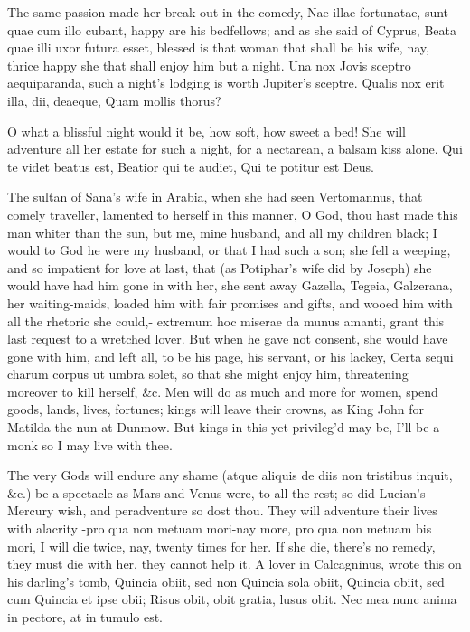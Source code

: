 {The same passion made her break out in the comedy, Nae illae
fortunatae, sunt quae cum illo cubant, happy are his bedfellows; and as
she said of Cyprus, Beata quae illi uxor futura esset, blessed is
that woman that shall be his wife, nay, thrice happy she that shall
enjoy him but a night. Una nox Jovis sceptro aequiparanda, such a
night's lodging is worth Jupiter's sceptre.
Qualis nox erit illa, dii, deaeque,
Quam mollis thorus?

O what a blissful night would it be, how soft, how sweet a bed! She
will adventure all her estate for such a night, for a nectarean, a
balsam kiss alone.
Qui te videt beatus est,
Beatior qui te audiet,
Qui te potitur est Deus.

The sultan of Sana's wife in Arabia, when she had seen Vertomannus,
that comely traveller, lamented to herself in this manner, O God,
thou hast made this man whiter than the sun, but me, mine husband, and
all my children black; I would to God he were my husband, or that I had
such a son; she fell a weeping, and so impatient for love at last, that
(as Potiphar's wife did by Joseph) she would have had him gone in with
her, she sent away Gazella, Tegeia, Galzerana, her waiting-maids,
loaded him with fair promises and gifts, and wooed him with all the
rhetoric she could,- extremum hoc miserae da munus amanti, grant this
last request to a wretched lover. But when he gave not consent, she
would have gone with him, and left all, to be his page, his servant, or
his lackey, Certa sequi charum corpus ut umbra solet, so that she might
enjoy him, threatening moreover to kill herself, \&c. Men will do as
much and more for women, spend goods, lands, lives, fortunes; kings
will leave their crowns, as King John for Matilda the nun at Dunmow.
But kings in this yet privileg'd may be,
I'll be a monk so I may live with thee.

The very Gods will endure any shame (atque aliquis de diis non
tristibus inquit, \&c.) be a spectacle as Mars and Venus were, to all
the rest; so did Lucian's Mercury wish, and peradventure so dost thou.
They will adventure their lives with alacrity -pro qua non metuam
mori-nay more, pro qua non metuam bis mori, I will die twice, nay,
twenty times for her. If she die, there's no remedy, they must die with
her, they cannot help it. A lover in Calcagninus, wrote this on his
darling's tomb,
Quincia obiit, sed non Quincia sola obiit,
Quincia obiit, sed cum Quincia et ipse obii;
Risus obit, obit gratia, lusus obit.
Nec mea nunc anima in pectore, at in tumulo est.

}
